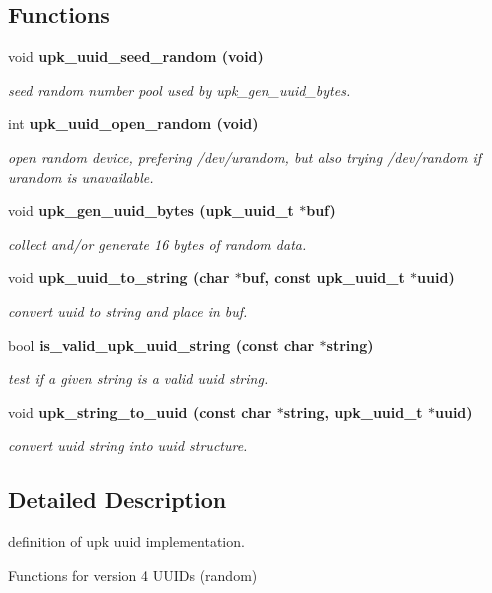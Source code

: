 \subsection*{Functions}
\begin{CompactItemize}
\item 
void \bf{upk\_\-uuid\_\-seed\_\-random} (void)
\begin{CompactList}\small\item\em seed random number pool used by upk\_\-gen\_\-uuid\_\-bytes. \item\end{CompactList}\item 
int \bf{upk\_\-uuid\_\-open\_\-random} (void)
\begin{CompactList}\small\item\em open random device, prefering /dev/urandom, but also trying /dev/random if urandom is unavailable. \item\end{CompactList}\item 
void \bf{upk\_\-gen\_\-uuid\_\-bytes} (\bf{upk\_\-uuid\_\-t} $\ast$buf)
\begin{CompactList}\small\item\em collect and/or generate 16 bytes of random data. \item\end{CompactList}\item 
void \bf{upk\_\-uuid\_\-to\_\-string} (char $\ast$buf, const \bf{upk\_\-uuid\_\-t} $\ast$uuid)
\begin{CompactList}\small\item\em convert uuid to string and place in buf. \item\end{CompactList}\item 
bool \bf{is\_\-valid\_\-upk\_\-uuid\_\-string} (const char $\ast$string)
\begin{CompactList}\small\item\em test if a given string is a valid uuid string. \item\end{CompactList}\item 
void \bf{upk\_\-string\_\-to\_\-uuid} (const char $\ast$string, \bf{upk\_\-uuid\_\-t} $\ast$uuid)
\begin{CompactList}\small\item\em convert uuid string into uuid structure. \item\end{CompactList}\end{CompactItemize}


\subsection{Detailed Description}
definition of upk uuid implementation. 

Functions for version 4 UUIDs (random) 